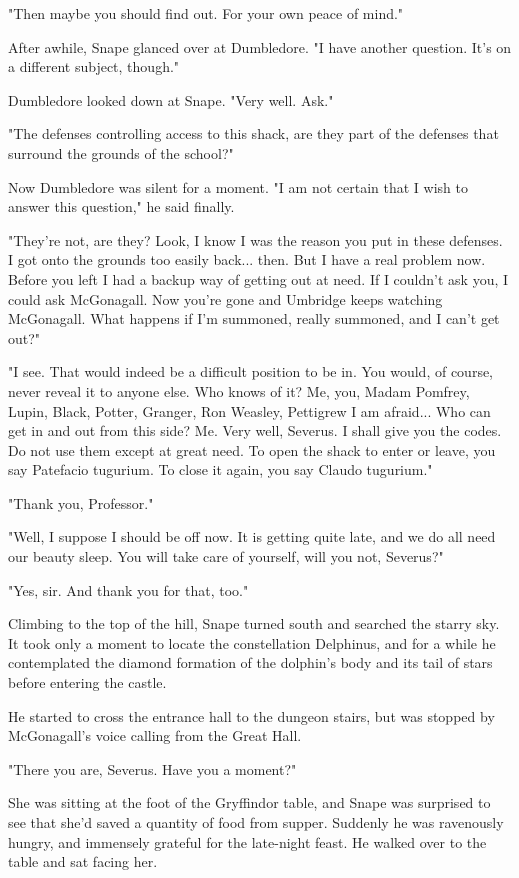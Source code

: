 \documentclass[a4paper,11pt]{article}
\begin{document}
"Then maybe you should find out. For your own peace of mind."

After awhile, Snape glanced over at Dumbledore. "I have another question. It's on a different subject, though."

Dumbledore looked down at Snape. "Very well. Ask."

"The defenses controlling access to this shack, are they part of the defenses that surround the grounds of the school?"

Now Dumbledore was silent for a moment. "I am not certain that I wish to answer this question," he said finally.

"They're not, are they? Look, I know I was the reason you put in these defenses. I got onto the grounds too easily back... then. But I have a real problem now. Before you left I had a backup way of getting out at need. If I couldn't ask you, I could ask McGonagall. Now you're gone and Umbridge keeps watching McGonagall. What happens if I'm summoned, really summoned, and I can't get out?"

"I see. That would indeed be a difficult position to be in. You would, of course, never reveal it to anyone else. Who knows of it? Me, you, Madam Pomfrey, Lupin, Black, Potter, Granger, Ron Weasley, Pettigrew I am afraid... Who can get in and out from this side? Me. Very well, Severus. I shall give you the codes. Do not use them except at great need. To open the shack to enter or leave, you say Patefacio tugurium. To close it again, you say Claudo tugurium."

"Thank you, Professor."

"Well, I suppose I should be off now. It is getting quite late, and we do all need our beauty sleep. You will take care of yourself, will you not, Severus?"

"Yes, sir. And thank you for that, too."

Climbing to the top of the hill, Snape turned south and searched the starry sky. It took only a moment to locate the constellation Delphinus, and for a while he contemplated the diamond formation of the dolphin's body and its tail of stars before entering the castle.

He started to cross the entrance hall to the dungeon stairs, but was stopped by McGonagall's voice calling from the Great Hall.

"There you are, Severus. Have you a moment?"

She was sitting at the foot of the Gryffindor table, and Snape was surprised to see that she'd saved a quantity of food from supper. Suddenly he was ravenously hungry, and immensely grateful for the late-night feast. He walked over to the table and sat facing her.
\end{document}
